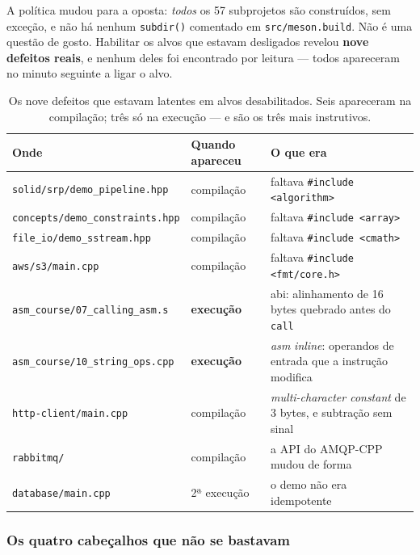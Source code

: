 A política mudou para a oposta: \emph{todos} os 57 subprojetos são construídos,
sem exceção, e não há nenhum \texttt{subdir()} comentado em
\texttt{src/meson.build}. Não é uma questão de gosto. Habilitar os alvos que
estavam desligados revelou \textbf{nove defeitos reais}, e nenhum deles foi
encontrado por leitura --- todos apareceram no minuto seguinte a ligar o alvo.

\begin{table}[htbp]
\centering
\caption{Os nove defeitos que estavam latentes em alvos desabilitados. Seis
         apareceram na compilação; três só na execução --- e são os três mais
         instrutivos.}
\label{tab:seis-bugs}
\footnotesize
\begin{tabular}{@{}p{}p{}p{}@{}}
\toprule
\textbf{Onde} & \textbf{Quando apareceu} & \textbf{O que era} \\
\midrule
\texttt{solid/srp/demo\_pipeline.hpp} & compilação & faltava \texttt{\#include <algorithm>} \\
\texttt{concepts/demo\_constraints.hpp} & compilação & faltava \texttt{\#include <array>} \\
\texttt{file\_io/demo\_sstream.hpp} & compilação & faltava \texttt{\#include <cmath>} \\
\texttt{aws/s3/main.cpp} & compilação & faltava \texttt{\#include <fmt/core.h>} \\
\midrule
\texttt{asm\_course/07\_calling\_asm.s} & \textbf{execução} & \gls{abi}: alinhamento de 16 bytes quebrado antes do \texttt{call} \\
\texttt{asm\_course/10\_string\_ops.cpp} & \textbf{execução} & \emph{asm} \emph{inline}: operandos de entrada que a instrução modifica \\
\midrule
\texttt{http-client/main.cpp} & compilação & \emph{multi-character constant} de 3 bytes, e subtração sem sinal \\
\texttt{rabbitmq/} & compilação & a API do AMQP-CPP mudou de forma \\
\texttt{database/main.cpp} & 2ª execução & o demo não era idempotente \\
\bottomrule
\end{tabular}
\end{table}

\subsubsection{Os quatro cabeçalhos que não se bastavam}


